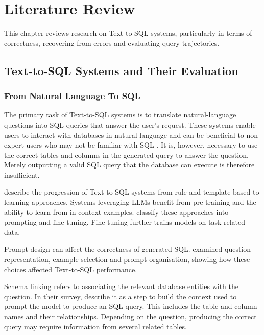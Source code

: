 \section{Literature Review}
\label{sec:literature-review}

This chapter reviews research on Text-to-SQL systems, 
particularly in terms of correctness, 
recovering from errors and evaluating query trajectories.  

\subsection{Text-to-SQL Systems and Their Evaluation}
\label{sec:literature-foundations}

\subsubsection{From Natural Language To SQL}

The primary task of Text-to-SQL systems is to translate natural-language 
questions into SQL queries that answer the user's request.
These systems enable users to interact with databases in natural language 
and can be beneficial to non-expert users 
who may not be familiar with SQL \citep{shi2025survey}.
It is, however, necessary to use the correct tables and columns 
in the generated query to answer the question.
Merely outputting a valid SQL query that the database can execute is therefore insufficient.

\citet{shi2025survey} describe the progression of Text-to-SQL systems from 
rule and template-based to learning approaches.  
Systems leveraging LLMs benefit from pre-training  
and the ability to learn from in-context examples. 
\citet{shi2025survey} classify these approaches into prompting
and fine-tuning. Fine-tuning further trains models on task-related data.

Prompt design can affect the correctness of generated SQL.
\citet{gao2024benchmark} examined question representation,
example selection and prompt organisation, showing how these choices
affected Text-to-SQL performance.

Schema linking refers to associating the relevant database entities with the question.
In their survey, \citet{shi2025survey} describe it as a step 
to build the context used to prompt the model to produce an SQL query.
This includes the table and column names and their relationships.
Depending on the question, producing the correct query 
may require information from several related tables.

